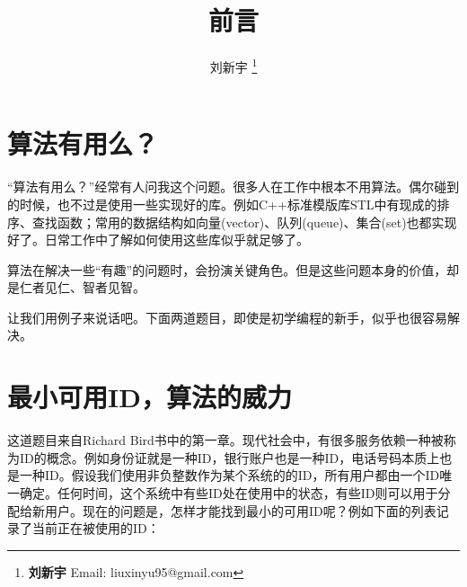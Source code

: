 \documentclass[UTF8]{article}
\begin{document}


\title{前言}

\author{刘新宇
\thanks{{\bfseries 刘新宇} \newline
  Email: liuxinyu95@gmail.com \newline}
  }

\maketitle
\fi


\section{算法有用么？}
\label{why}

“算法有用么？”经常有人问我这个问题。很多人在工作中根本不用算法。偶尔碰到的时候，也不过是使用一些实现好的库。例如C++标准模版库STL中有现成的排序、查找函数；常用的数据结构如向量(vector)、队列(queue)、集合(set)也都实现好了。日常工作中了解如何使用这些库似乎就足够了。

算法在解决一些“有趣”的问题时，会扮演关键角色。但是这些问题本身的价值，却是仁者见仁、智者见智。

让我们用例子来说话吧。下面两道题目，即使是初学编程的新手，似乎也很容易解决。

\section{最小可用ID，算法的威力}
\label{min-free} 

这道题目来自Richard Bird书中的第一章\cite{fp-pearls}。现代社会中，有很多服务依赖一种被称为ID的概念。例如身份证就是一种ID，银行账户也是一种ID，电话号码本质上也是一种ID。假设我们使用非负整数作为某个系统的的ID，所有用户都由一个ID唯一确定。任何时间，这个系统中有些ID处在使用中的状态，有些ID则可以用于分配给新用户。现在的问题是，怎样才能找到最小的可用ID呢？例如下面的列表记录了当前正在被使用的ID：
\end{document}
